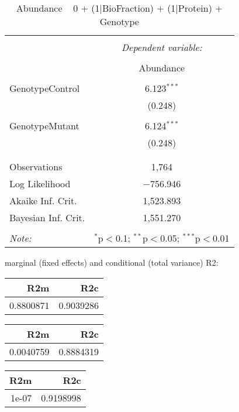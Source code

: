 \documentclass[11pt]{report}
\begin{document}
\begin{table}[!htbp] \centering 
  \caption{Abundance ~ 0 + (1|BioFraction) + (1|Protein) + Genotype} 
  \label{} 
\begin{tabular}{@{\extracolsep{5pt}}lc} 
\\[-1.8ex]\hline 
\hline \\[-1.8ex] 
 & \multicolumn{1}{c}{\textit{Dependent variable:}} \\ 
\cline{2-2} 
\\[-1.8ex] & Abundance \\ 
\hline \\[-1.8ex] 
 GenotypeControl & 6.123$^{***}$ \\ 
  & (0.248) \\ 
  & \\ 
 GenotypeMutant & 6.124$^{***}$ \\ 
  & (0.248) \\ 
  & \\ 
\hline \\[-1.8ex] 
Observations & 1,764 \\ 
Log Likelihood & $-$756.946 \\ 
Akaike Inf. Crit. & 1,523.893 \\ 
Bayesian Inf. Crit. & 1,551.270 \\ 
\hline 
\hline \\[-1.8ex] 
\textit{Note:}  & \multicolumn{1}{r}{$^{*}$p$<$0.1; $^{**}$p$<$0.05; $^{***}$p$<$0.01} \\ 
\end{tabular} 
\end{table} 
marginal (fixed effects) and conditional (total variance) R2:

\begin{tabular}{r|r}
\hline
R2m & R2c\\
\hline
0.8800871 & 0.9039286\\
\hline
\end{tabular}

\begin{tabular}{r|r}
\hline
R2m & R2c\\
\hline
0.0040759 & 0.8884319\\
\hline
\end{tabular}

\begin{tabular}{r|r}
\hline
R2m & R2c\\
\hline
1e-07 & 0.9198998\\
\hline
\end{tabular}
\end{document}
